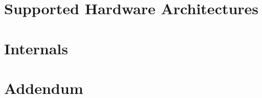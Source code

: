\part{Supported Hardware Architectures}














\part{\ecs{} Internals}






\appendix
{}
\part*{Addendum}






\concludebook
